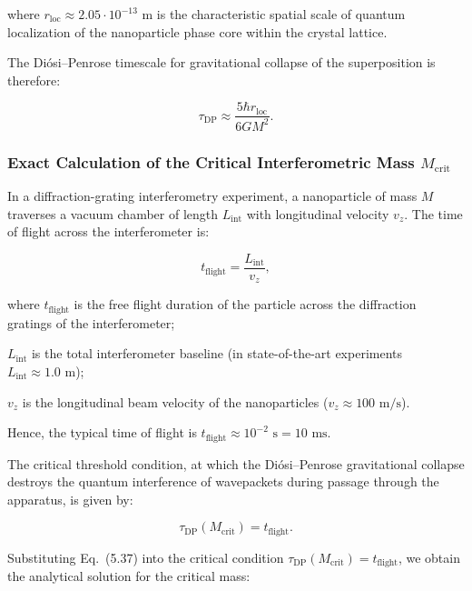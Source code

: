 \documentclass[11pt,a4paper]{article}
\theoremstyle{definition}
\begin{document}
where $r_{\text{loc}} \approx 2.05 \cdot 10^{-13}\text{ m}$ is the characteristic spatial scale of quantum localization of the nanoparticle phase core within the crystal lattice.

The Diósi--Penrose timescale for gravitational collapse of the superposition is therefore:

\begin{equation}\label{eq:5.37}\tag{5.37}
\tau_{\text{DP}} \approx \frac{5 \hbar r_{\text{loc}}}{6 G M^2}.
\end{equation}

\subsubsection{Exact Calculation of the Critical Interferometric Mass $M_{\text{crit}}$}\label{sec:5.2.3}

In a diffraction-grating interferometry experiment, a nanoparticle of mass $M$ traverses a vacuum chamber of length $L_{\text{int}}$ with longitudinal velocity $v_z$. The time of flight across the interferometer is:

\begin{equation}\label{eq:5.38}\tag{5.38}
t_{\text{flight}} = \frac{L_{\text{int}}}{v_z},
\end{equation}

where $t_{\text{flight}}$ is the free flight duration of the particle across the diffraction gratings of the interferometer;  

$L_{\text{int}}$ is the total interferometer baseline (in state-of-the-art experiments $L_{\text{int}} \approx 1.0\text{ m}$);  

$v_z$ is the longitudinal beam velocity of the nanoparticles ($v_z \approx 100\text{ m/s}$).

Hence, the typical time of flight is $t_{\text{flight}} \approx 10^{-2}\text{ s} = 10\text{ ms}$.

The critical threshold condition, at which the Diósi--Penrose gravitational collapse destroys the quantum interference of wavepackets during passage through the apparatus, is given by:

\begin{equation}\label{eq:5.39}\tag{5.39}
\tau_{\text{DP}}(M_{\text{crit}}) = t_{\text{flight}}.
\end{equation}

Substituting Eq.~(5.37) into the critical condition $\tau_{\text{DP}}(M_{\text{crit}}) = t_{\text{flight}}$, we obtain the analytical solution for the critical mass:
\end{document}
